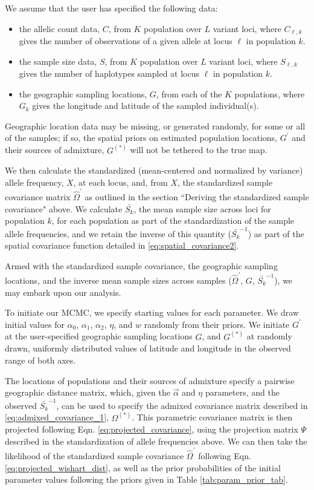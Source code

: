 \documentclass[12pt]{article}
\newcommand{\identifyadmixsource}[1]{{#1^{(*)}}}
\begin{document}
We assume that the user has specified the following data: 
\begin{itemize}
\item the allelic count data, $C$, from $K$ population over $L$ variant loci, where $C_{\ell,k}$ gives the number of observations of a given allele at locus $\ell$ in population $k$. 
\item the sample size data, $S$, from $K$ population over $L$ variant loci, where $S_{\ell,k}$ gives the number of haplotypes sampled at locus $\ell$ in population $k$.
\item the geographic sampling locations, $G$, from each of the $K$ populations, where $G_k$ gives the longitude and latitude of the sampled individual(s).
\end{itemize}

Geographic location data may be missing, or generated randomly, for some or all of the samples; if so, the spatial priors on estimated population locations, $G^{\prime}$ and their sources of admixture, $\identifyadmixsource{G}$ will not be tethered to the true map. 

We then calculate the standardized (mean-centered and normalized by variance) allele frequency, $X$, at each locus, and, from $X$, the standardized sample covariance matrix $\widehat{\Omega}^{\prime}$ as outlined in the section ``Deriving the standardized sample covariance" above.  We calculate $\bar{S_k}$, the mean sample size across loci for population $k$, for each population as part of the standardization of the sample allele frequencies, and we retain the inverse of this quantity ($\bar{S_k}^{-1}$) as part of the spatial covariance function detailed in \eqref{eq:spatial_covariance2}.

Armed with the standardized sample covariance, the geographic sampling locations, and the inverse mean sample sizes across samples ($\widehat{\Omega}^{\prime}$, $G$, $\bar{S_k}^{-1}$), we may embark upon our analysis.

To initiate our MCMC, we specify starting values for each parameter.  We draw initial values for $\alpha_0$, $\alpha_1$, $\alpha_2$, $\eta$, and $w$ randomly from their priors.  We initiate $G^{\prime}$ at the user-specified geographic sampling locations $G$, and $\identifyadmixsource{G}$ at randomly drawn, uniformly distributed values of latitude and longitude in the observed range of both axes.  

The locations of populations and their sources of admixture specify a pairwise geographic distance matrix, which, given the $\vec{\alpha}$ and $\eta$ parameters, and the observed $\bar{S_k}^{-1}$, can be used to specify the admixed covariance matrix described in \eqref{eq:admixed_covariance_1}, $\identifyadmixsource{\Omega}$.  This parametric covariance matrix is then projected following Eqn. \eqref{eq:projected_covariance}, using the projection matrix $\Psi$ described in the standardization of allele frequencies above.  We can then take the likelihood of the standardized sample covariance $\widehat{\Omega}^{\prime}$ following Eqn. \eqref{eq:projected_wishart_dist}, as well as the prior probabilities of the initial parameter values following the priors given in Table \ref{tab:param_prior_tab}.
\end{document}
